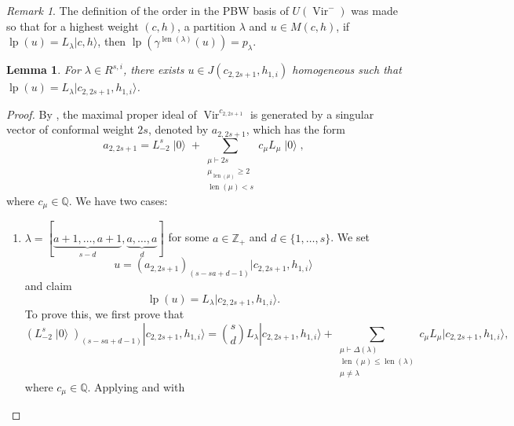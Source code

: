 \documentclass[a4paper, 12pt, reqno]{amsart}
\newtheorem{lemma}[theorem]{Lemma}
\theoremstyle{remark}
\newtheorem{remark}[theorem]{Remark}
\DeclareMathOperator{\Vir}{Vir}
\DeclareMathOperator{\len}{len}
\DeclareMathOperator{\vac}{|0\rangle}
\DeclareMathOperator{\lp}{lp}
\begin{document}
\begin{remark}
  \label{rmk:4}
  The definition of the order in the PBW basis of $U(\Vir^-)$ was made so that for a highest weight $(c, h)$, a partition $\lambda$ and $u \in M(c, h)$, if $\lp(u) = L_{\lambda}|c, h\rangle$, then $\lp(\gamma^{\len(\lambda)}(u)) = p_{\lambda}$.
\end{remark}

\begin{lemma}
  \label{lmm:11}
  For $\lambda \in R^{s, i}$, there exists $u \in J(c_{2, 2s + 1}, h_{1, i})$ homogeneous such that $\lp(u) = L_{\lambda}|c_{2, 2s + 1}, h_{1, i}\rangle$.
\end{lemma}

\begin{proof}
  By , the maximal proper ideal of $\Vir^{c_{2, 2s + 1}}$ is generated by a singular vector of conformal weight $2s$, denoted by $a_{2, 2s + 1}$, which has the form
  \begin{equation}
    \label{eq:7}
    a_{2, 2s + 1} = L_{-2}^s\vac + \sum_{\substack{\mu \vdash 2s \\ \mu_{\len(\mu)} \ge 2 \\ \len(\mu) < s}}c_{\mu}L_{\mu}\vac,
  \end{equation}
  where $c_{\mu} \in \mathbb{Q}$.
  We have two cases:
  \begin{enumerate}
  \item $\lambda = [\underbrace{a + 1, \dots, a + 1}_{s - d}, \underbrace{a, \dots, a}_d]$ for some $a \in \mathbb{Z}_+$ and $d \in \{1, \dots, s\}$.
    We set
    \begin{equation*}
      u = (a_{2, 2s + 1})_{(s - sa + d - 1)}|c_{2, 2s + 1}, h_{1, i}\rangle
    \end{equation*}
    and claim
    \begin{equation*}
      \lp(u) = L_{\lambda}|c_{2, 2s + 1}, h_{1, i}\rangle.
    \end{equation*}
    To prove this, we first prove that
    \begin{equation}
      \label{eq:8}
      (L_{-2}^s\vac)_{(s - sa + d - 1)}|c_{2, 2s + 1}, h_{1, i}\rangle = \binom{s}{d}L_{\lambda}|c_{2, 2s + 1}, h_{1, i}\rangle + \sum_{\substack{\mu \vdash \Delta(\lambda) \\ \len(\mu) \le \len(\lambda) \\ \mu \neq \lambda}}c_{\mu}L_{\mu}|c_{2, 2s + 1}, h_{1, i}\rangle,
    \end{equation}
    where $c_{\mu} \in \mathbb{Q}$.
    Applying  and  with

\end{enumerate}
\end{proof}
\end{document}
